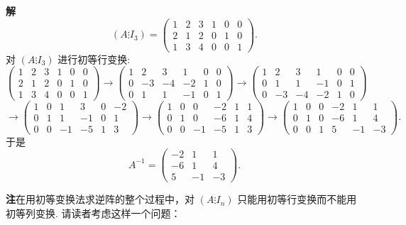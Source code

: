 \documentclass[UTF8, 12pt, fontset=fandol, oneside]{ctexart}
\begin{document}
\noindent\textbf{解}\quad
\[
(A\vdots I_3)=
\left(\begin{array}{ccc|ccc}
1 & 2 & 3 & 1 & 0 & 0\\
2 & 1 & 2 & 0 & 1 & 0\\
1 & 3 & 4 & 0 & 0 & 1
\end{array}\right).
\]
对 $(A\vdots I_3)$ 进行初等行变换:
\[
\left(\begin{array}{ccc|ccc}
1 & 2 & 3 & 1 & 0 & 0\\
2 & 1 & 2 & 0 & 1 & 0\\
1 & 3 & 4 & 0 & 0 & 1
\end{array}\right)
\longrightarrow
\left(\begin{array}{ccc|ccc}
1 & 2 & 3 & 1 & 0 & 0\\
0 & -3 & -4 & -2 & 1 & 0\\
0 & 1 & 1 & -1 & 0 & 1
\end{array}\right)
\longrightarrow
\left(\begin{array}{ccc|ccc}
1 & 2 & 3 & 1 & 0 & 0\\
0 & 1 & 1 & -1 & 0 & 1\\
0 & -3 & -4 & -2 & 1 & 0
\end{array}\right)
\]
\[
\longrightarrow
\left(\begin{array}{ccc|ccc}
1 & 0 & 1 & 3 & 0 & -2\\
0 & 1 & 1 & -1 & 0 & 1\\
0 & 0 & -1 & -5 & 1 & 3
\end{array}\right)
\longrightarrow
\left(\begin{array}{ccc|ccc}
1 & 0 & 0 & -2 & 1 & 1\\
0 & 1 & 0 & -6 & 1 & 4\\
0 & 0 & -1 & -5 & 1 & 3
\end{array}\right)
\longrightarrow
\left(\begin{array}{ccc|ccc}
1 & 0 & 0 & -2 & 1 & 1\\
0 & 1 & 0 & -6 & 1 & 4\\
0 & 0 & 1 & 5 & -1 & -3
\end{array}\right).
\]
于是
\[
A^{-1}=\left(\begin{array}{rrr}
-2 & 1 & 1\\
-6 & 1 & 4\\
5 & -1 & -3
\end{array}\right).
\]

\noindent\textbf{注}\quad 在用初等变换法求逆阵的整个过程中，对 $(A\vdots I_n)$ 只能用初等行变换而不能用初等列变换. 请读者考虑这样一个问题：
\end{document}
